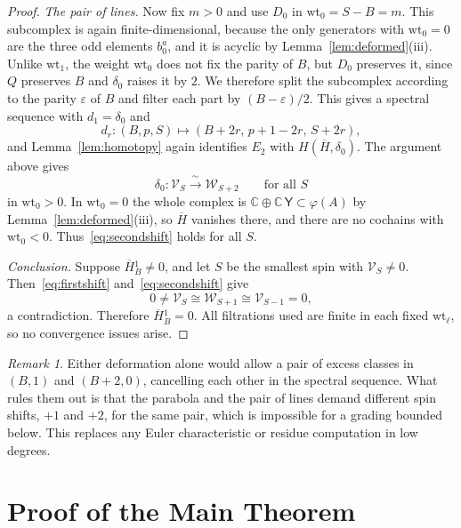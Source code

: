 \documentclass[11pt]{amsart}
\numberwithin{equation}{section}
\theoremstyle{definition}
\theoremstyle{remark}
\newtheorem{remark}[theorem]{Remark}
\newcommand{\C}{\mathbb{C}}
\newcommand{\Yc}{\mathsf{Y}}
\newcommand{\wt}{\mathrm{wt}}
\newcommand{\Hb}{\overline{H}}
\begin{document}
\begin{proof}
\emph{The pair of lines.} Now fix $m>0$ and use $D_0$ in $\wt_0=S-B=m$. This subcomplex is again finite-dimensional, because the only generators with $\wt_0=0$ are the three odd elements $b_0^a$, and it is acyclic by Lemma~\ref{lem:deformed}(iii). Unlike $\wt_1$, the weight $\wt_0$ does not fix the parity of $B$, but $D_0$ preserves it, since $Q$ preserves $B$ and $\delta_0$ raises it by $2$. We therefore split the subcomplex according to the parity $\varepsilon$ of $B$ and filter each part by $(B-\varepsilon)/2$. This gives a spectral sequence with $d_1=\delta_0$ and
\begin{equation}\label{eq:dr-lines}
d_r:(B,p,S)\longmapsto(B+2r,\,p+1-2r,\,S+2r),
\end{equation}
and Lemma~\ref{lem:homotopy} again identifies $E_2$ with $H(\Hb,\delta_0)$. The argument above gives
\begin{equation}\label{eq:secondshift}
\delta_0:\mathcal V_S\xrightarrow{\ \sim\ }\mathcal W_{S+2}\qquad\text{for all }S
\end{equation}
in $\wt_0>0$. In $\wt_0=0$ the whole complex is $\C\oplus\C\,\Yc\subset\varphi(A)$ by Lemma~\ref{lem:deformed}(iii), so $\Hb$ vanishes there, and there are no cochains with $\wt_0<0$. Thus~\eqref{eq:secondshift} holds for all $S$.

\emph{Conclusion.} Suppose $\Hb{}_B^1\ne0$, and let $S$ be the smallest spin with $\mathcal V_S\ne0$. Then~\eqref{eq:firstshift} and~\eqref{eq:secondshift} give
\begin{equation}\label{eq:contradiction}
0\ne\mathcal V_S\cong\mathcal W_{S+1}\cong\mathcal V_{S-1}=0,
\end{equation}
a contradiction. Therefore $\Hb{}_B^1=0$. All filtrations used are finite in each fixed $\wt_\ell$, so no convergence issues arise.
\end{proof}

\begin{remark}
Either deformation alone would allow a pair of excess classes in $(B,1)$ and $(B+2,0)$, cancelling each other in the spectral sequence. What rules them out is that the parabola and the pair of lines demand different spin shifts, $+1$ and $+2$, for the same pair, which is impossible for a grading bounded below. This replaces any Euler characteristic or residue computation in low degrees.
\end{remark}

\section{Proof of the Main Theorem}\label{sec:proof}
\end{document}
